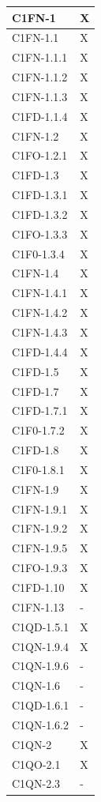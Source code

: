 \begin{footnotesize}
\begin{longtable}{|p{}|p{}|}
 C1FN-1 &X \\ \hline
 C1FN-1.1 &X  \\ \hline
 C1FN-1.1.1 &X  \\ \hline
 C1FN-1.1.2  &X  \\ \hline
 C1FN-1.1.3 &X  \\ \hline
 C1FD-1.1.4  &X  \\ \hline
 C1FN-1.2 &X  \\ \hline
 C1FO-1.2.1 &X  \\ \hline
 C1FD-1.3 &X  \\ \hline
 C1FD-1.3.1  &X  \\ \hline
 C1FD-1.3.2 &X  \\ \hline
 C1FO-1.3.3 &X  \\ \hline
 C1F0-1.3.4 &X  \\ \hline
 C1FN-1.4 &X  \\ \hline
 C1FN-1.4.1 &X  \\ \hline
 C1FN-1.4.2 &X  \\ \hline
 C1FN-1.4.3 &X  \\ \hline
 C1FD-1.4.4 &X  \\ \hline
 C1FD-1.5 &X  \\ \hline
 C1FD-1.7 &X  \\ \hline
 C1FD-1.7.1  &X  \\ \hline
 C1F0-1.7.2 &X  \\ \hline
 C1FD-1.8 &X  \\ \hline
 C1F0-1.8.1 &X  \\ \hline
 C1FN-1.9 &X  \\ \hline
 C1FN-1.9.1  &X  \\ \hline
 C1FN-1.9.2 &X  \\ \hline
 C1FN-1.9.5 &X  \\ \hline
 C1FO-1.9.3 &X  \\ \hline
 C1FD-1.10 &X  \\ \hline
 C1FN-1.13 &-  \\ \hline
 C1QD-1.5.1 &X  \\ \hline
 C1QN-1.9.4 &X  \\ \hline
 C1QN-1.9.6 &-  \\ \hline
 C1QN-1.6 &- \\ \hline
 C1QD-1.6.1&- \\ \hline
 C1QN-1.6.2&-   \\ \hline
 C1QN-2&X \\ \hline
 C1QO-2.1&X \\ \hline
 C1QN-2.3&-  \\ \hline

\end{longtable}
\end{footnotesize}
